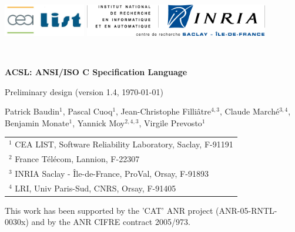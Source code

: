 \documentclass[a4paper,11pt,twoside,openright]{report}
\newcommand{\version}{1.4}
\begin{document}
\sloppy
{}

\begin{titlepage}
\begin{center}
\includegraphics[height=14mm]{cealistlogo.jpg}
\hfill
\includegraphics[height=14mm]{inriasaclaylogo.png}

\vfill

~

\vspace{20mm}

{\Huge\bfseries ACSL: ANSI/ISO C Specification Language}

\bigskip

{\LARGE Preliminary design (version \version, \today)}

\vspace{20mm}

{Patrick Baudin$^1$, Pascal Cuoq$^1$, Jean-Christophe Filli\^atre$^{4,3}$, Claude March\'e$^{3,4}$,\\ Benjamin Monate$^1$, Yannick Moy$^{2,4,3}$, Virgile Prevosto$^1$}

\medskip

\begin{tabular}{l}
$^1$ CEA LIST, Software Reliability Laboratory, Saclay, F-91191 \\
$^2$ France T\'el\'ecom, Lannion, F-22307 \\
$^3$ INRIA Saclay - \^Ile-de-France, ProVal, Orsay, F-91893 \\
$^4$ LRI, Univ Paris-Sud, CNRS, Orsay, F-91405
\end{tabular}

\vfill


\begin{flushleft}
  This work has been supported by the 'CAT' ANR project
  (ANR-05-RNTL-0030x) and by the ANR CIFRE contract 2005/973.
\end{flushleft}

\end{center}
\end{titlepage}

\clearpage
\label{chap:contents}
\tableofcontents
\end{document}

